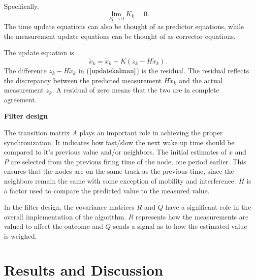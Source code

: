 \documentclass[journal]{IEEEtran}
\begin{document}
Specifically,
\begin{equation}
\mathop {\lim }\limits_{P_k \to 0 } {K_k} = 0.
\end{equation}
The time update equations can also be thought of as predictor
equations, while the measurement update equations can be thought of
as corrector equations.
\par
The update equation is
\begin{equation}
\tilde x_k = \tilde x_k + K(z_k-H\tilde x_k).
\label{updatekalman}
\end{equation}
The difference $z_k - H\tilde x_k$ in ($\ref{updatekalman}$) is the residual. The residual reflects the discrepancy between the predicted measurement $H\tilde x_k$ and the actual measurement $z_k$. A residual of zero means that the two are in complete agreement. \par \noindent
\textbf{Filter design} \par
The transition matrix $A$ plays an important role in achieving
the proper synchronization. It indicates how fast/slow the next wake up time should be compared
to it's previous value and/or neighbors. The initial estimates of $x$ and $P$ are selected from the
previous firing time of the node, one period earlier. This ensures that the nodes are on the same track as the previous time, since the neighbors remain the same with some exception of mobility and interference. $H$ is a factor used to compare the predicted value to the measured value. \par
In the filter design, the covariance matrices $R$ and $Q$ have a significant
role in the overall implementation of the algorithm. $R$ represents how
 the measurements are valued to affect the outcome and $Q$
sends a signal as to how the estimated value is weighed.
\section{\textbf{Results and Discussion}}
\end{document}
